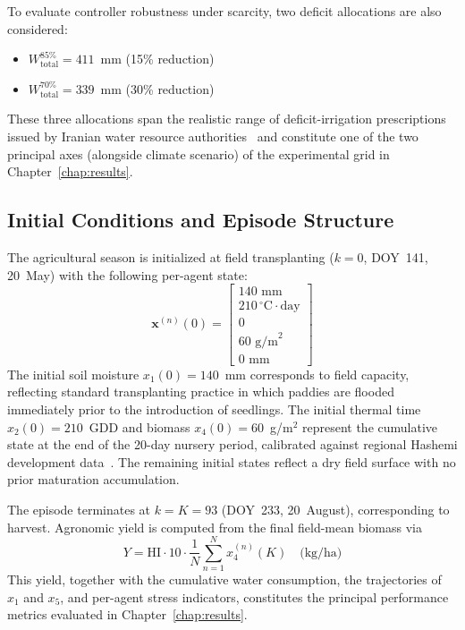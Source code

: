 To evaluate controller robustness under scarcity, two deficit
allocations are also considered:
\begin{itemize}
\item $W_{\mathrm{total}}^{85\%} = 411$~mm (15\% reduction)
\item $W_{\mathrm{total}}^{70\%} = 339$~mm (30\% reduction)
\end{itemize}
These three allocations span the realistic range of deficit-irrigation
prescriptions issued by Iranian water resource
authorities~\cite{Mesgaran2018,Nouri2023} and constitute one of the
two principal axes (alongside climate scenario) of the experimental
grid in Chapter~\ref{chap:results}.

\subsection{Initial Conditions and Episode Structure}
\label{ssec:sys-init}

The agricultural season is initialized at field transplanting
($k = 0$, DOY~141, 20~May) with the following per-agent state:
\begin{equation}
\mathbf{x}^{(n)}(0) = \begin{bmatrix}
140 \text{ mm} \\
210\, ^{\circ}\mathrm{C} \cdot \text{day} \\
0 \\
60 \text{ g/m}^2 \\
0 \text{ mm}
\end{bmatrix}
\label{eq:initial-state}
\end{equation}
The initial soil moisture $x_1(0) = 140$~mm corresponds to field
capacity, reflecting standard transplanting practice in which paddies
are flooded immediately prior to the introduction of seedlings. The
initial thermal time $x_2(0) = 210$~GDD and biomass
$x_4(0) = 60$~g/m$^2$ represent the cumulative state at the end of the
20-day nursery period, calibrated against regional Hashemi development
data~\cite{sadidi2021}. The remaining initial states reflect a dry
field surface with no prior maturation accumulation.

The episode terminates at $k = K = 93$ (DOY~233, 20~August),
corresponding to harvest. Agronomic yield is computed from the final
field-mean biomass via
\begin{equation}
Y = \mathrm{HI} \cdot 10 \cdot \frac{1}{N} \sum_{n=1}^{N} x_4^{(n)}(K)
\quad \text{(kg/ha)}
\label{eq:yield}
\end{equation}
This yield, together with the cumulative water consumption, the
trajectories of $x_1$ and $x_5$, and per-agent stress indicators,
constitutes the principal performance metrics evaluated in
Chapter~\ref{chap:results}.

